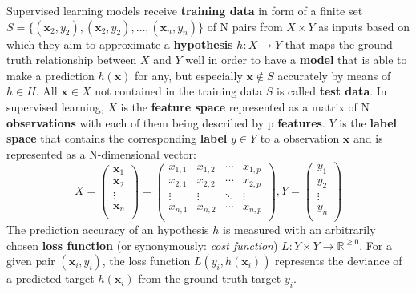 Supervised learning models receive \textbf{training data} in form of a finite set $ S = \{(\textbf{x}_{2}, y_2), (\textbf{x}_{2}, y_2), \dots, (\textbf{x}_{n}, y_n)\}$ of N pairs from $ X \times Y $ as inputs based on which they aim to approximate a \textbf{hypothesis} $ h: X \to Y $  that maps the ground truth relationship between $ X $ and $ Y $ well in order to have a \textbf{model} that is able to make a prediction $ h(\textbf{x}) $ for any, but especially $ \textbf{x} \notin S $ accurately by means of $ h \in H $. All $ \textbf{x} \in X $ not contained in the training data $ S $ is called \textbf{test data}. 
In supervised learning, $ X $ is the \textbf{feature space} represented as a matrix of N \textbf{observations} with each of them being described by p \textbf{features}. $ Y $ is the \textbf{label space} that contains the corresponding \textbf{label} $ y \in Y $ to a observation $ \textbf{x} $ and is represented as a N-dimensional vector:   
\begin{equation*}
X = 
\begin{pmatrix}
\textbf{x}_{1} \\
\textbf{x}_{2} \\
\vdots \\
\textbf{x}_{n} \\
\end{pmatrix} 
=
\begin{pmatrix}
x_{1,1} & x_{1,2} & \cdots & x_{1,p} \\
x_{2,1} & x_{2,2} & \cdots & x_{2,p} \\
\vdots  & \vdots  & \ddots & \vdots \\
x_{n,1} & x_{n,2} & \cdots & x_{n,p} \\
\end{pmatrix}
,
Y = 
\begin{pmatrix}
y_{1} \\
y_{2} \\
\vdots \\
y_{n} \\
\end{pmatrix}
\end{equation*}
The prediction accuracy of an hypothesis $ h $ is measured with an arbitrarily chosen \textbf{loss function} (or synonymously: \textit{cost function}) $ L : Y \times Y \to \mathbb{R}^{\geq 0}$. For a given pair $ (\textbf{x}_i, y_i) $, the loss function $ L(y_i, h(\textbf{x}_i)) $ represents the deviance of a predicted target $ h(\textbf{x}_i) $ from the ground truth target $ y_i $. 

